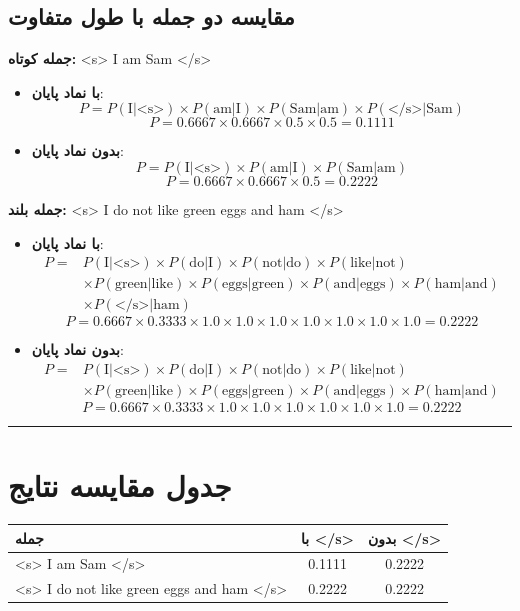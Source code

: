 \documentclass[11pt,a4paper]{article}
\newcommand{\en}[1]{\textenglish{#1}}
\newcommand{\separator}{\vspace{1em}\noindent\rule{\linewidth}{0.4pt}\vspace{1em}}
\begin{document}
\subsection*{مقایسه دو جمله با طول متفاوت}

\textbf{جمله کوتاه:} \en{<s> I am Sam </s>}
\begin{itemize}
\item \textbf{با نماد پایان}:
\[
P = P(\text{I}|\text{<s>}) \times P(\text{am}|\text{I}) \times P(\text{Sam}|\text{am}) \times P(\text{</s>}|\text{Sam})
\]
\[
P = 0.6667 \times 0.6667 \times 0.5 \times 0.5 = 0.1111
\]

\item \textbf{بدون نماد پایان}:
\[
P = P(\text{I}|\text{<s>}) \times P(\text{am}|\text{I}) \times P(\text{Sam}|\text{am})
\]
\[
P = 0.6667 \times 0.6667 \times 0.5 = 0.2222
\]
\end{itemize}

\textbf{جمله بلند:} \en{<s> I do not like green eggs and ham </s>}
\begin{itemize}
\item \textbf{با نماد پایان}:
\[
\begin{aligned}
P = & P(\text{I}|\text{<s>}) \times P(\text{do}|\text{I}) \times P(\text{not}|\text{do}) \times P(\text{like}|\text{not}) \\
& \times P(\text{green}|\text{like}) \times P(\text{eggs}|\text{green}) \times P(\text{and}|\text{eggs}) \times P(\text{ham}|\text{and}) \\
& \times P(\text{</s>}|\text{ham})
\end{aligned}
\]
\[
P = 0.6667 \times 0.3333 \times 1.0 \times 1.0 \times 1.0 \times 1.0 \times 1.0 \times 1.0 \times 1.0 = 0.2222
\]

\item \textbf{بدون نماد پایان}:
\[
\begin{aligned}
P = & P(\text{I}|\text{<s>}) \times P(\text{do}|\text{I}) \times P(\text{not}|\text{do}) \times P(\text{like}|\text{not}) \\
& \times P(\text{green}|\text{like}) \times P(\text{eggs}|\text{green}) \times P(\text{and}|\text{eggs}) \times P(\text{ham}|\text{and})
\end{aligned}
\]
\[
P = 0.6667 \times 0.3333 \times 1.0 \times 1.0 \times 1.0 \times 1.0 \times 1.0 \times 1.0 = 0.2222
\]
\end{itemize}

\separator
\section{جدول مقایسه نتایج}
\begin{center}
\begin{tabular}{|l|c|c|}
\hline
\textbf{جمله} & \textbf{با \en{</s>}} & \textbf{بدون \en{</s>}} \\
\hline
\en{<s> I am Sam </s>} & 0.1111 & 0.2222 \\
\hline
\en{<s> I do not like green eggs and ham </s>} & 0.2222 & 0.2222 \\
\hline
\end{tabular}
\end{center}
\end{document}
